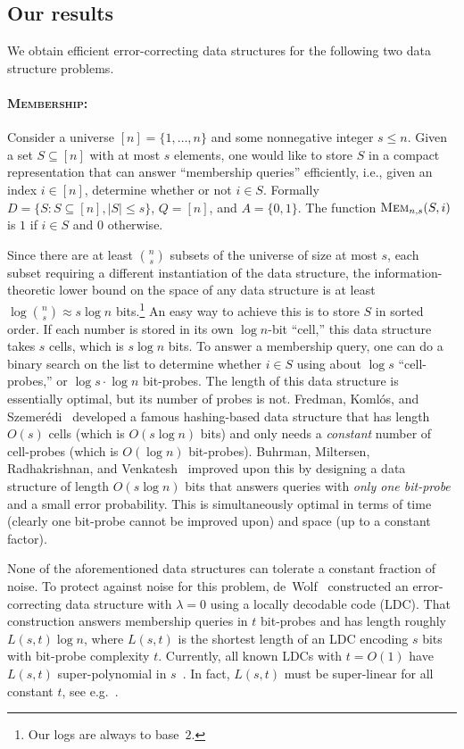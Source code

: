 \documentclass[11pt,english]{article}
\newcommand{\noun}[1]{\textsc{#1}}
\newcommand{\binom}[2]{{#1 \choose #2}}
\theoremstyle{definition}
\theoremstyle{remark}
\newcommand{\mem}{\mbox{\textsc{Mem}}}
\begin{document}
\subsection{Our results\label{sub:Our results}}

We obtain efficient error-correcting data structures for the following two data structure problems.

\paragraph{\textbf{\noun{Membership:}}}

Consider a universe $[n]=\{1,\ldots,n\}$ and some nonnegative integer
$s\leq n$. Given a set $S\subseteq[n]$ with at most $s$ elements,
one would like to store $S$ in a compact representation that can
answer ``membership queries'' efficiently, i.e., given an index
$i\in[n]$, determine whether or not $i\in S$. Formally $D=\{S:S\subseteq[n],|S|\leq s\}$,
$Q=[n]$, and $A=\{0,1\}$. The function $\mem_{n,s}(S,i)$ is $1$
if $i\in S$ and $0$ otherwise.

Since there are at least $\binom{n}{s}$ subsets of the universe of
size at most $s$, each subset requiring a different instantiation
of the data structure, the information-theoretic lower bound on the
space of any data structure is at least $\log\binom{n}{s}\approx s\log n$
bits.\footnote{Our logs are always to base~$2$.}
An easy way to achieve this is to store $S$ in sorted order. If
each number is stored in its own $\log n$-bit ``cell,'' this
data structure takes $s$ cells, which is $s\log n$ bits. To answer
a membership query, one can do a binary search on the list to determine
whether $i\in S$ using about $\log s$ ``cell-probes,'' or $\log s\cdot\log n$
bit-probes. The length of this data structure is essentially optimal,
but its number of probes is not. Fredman, Koml\'{o}s, and Szemer\'{e}di~\cite{fks:sparsetable}
developed a famous hashing-based data structure that has length $O(s)$
cells (which is $O(s\log n)$ bits) and only needs a \emph{constant}
number of cell-probes (which is $O(\log n)$ bit-probes). Buhrman,
Miltersen, Radhakrishnan, and Venkatesh~\cite{bmrv:bitvectorsj}
improved upon this by designing a data structure of length $O(s\log n)$
bits that answers queries with \emph{only one bit-probe} and a small error probability. 
This is simultaneously optimal in terms of time (clearly one bit-probe cannot
be improved upon) and space (up to a constant factor).

None of the aforementioned data structures can tolerate a constant fraction of noise.
To protect against noise for this problem, de~Wolf~\cite{wolf:ecdata}
constructed an error-correcting data structure with $\lambda=0$ using
a locally decodable code (LDC). That construction
answers membership queries in $t$ bit-probes and has length roughly
$L(s,t)\log n$, where $L(s,t)$ is the shortest length of an LDC encoding
$s$ bits with bit-probe complexity $t$. Currently, all known LDCs with $t=O(1)$ have $L(s,t)$ super-polynomial in $s$~\cite{bikr:improvedpir,yekhanin:3ldcj,efremenko:ldc}.
In fact, $L(s,t)$ must be super-linear for all constant $t$, see e.g.~\cite{katz&trevisan:ldc,kerenidis&wolf:qldcj,woodruff:ldclower}.
\end{document}
